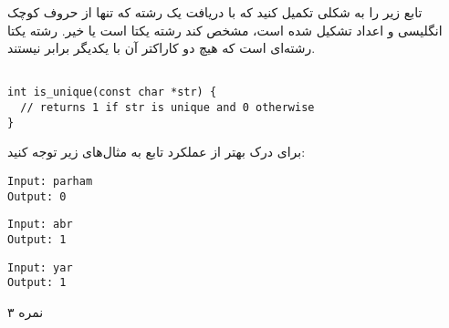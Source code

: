 \documentclass[../main.tex]{subfiles}
\begin{document}
تابع زیر را به شکلی تکمیل کنید که با دریافت یک رشته که تنها از حروف کوچک انگلیسی و اعداد تشکیل شده است، مشخص کند رشته یکتا است یا خیر. رشته یکتا رشته‌ای است که هیچ دو کاراکتر آن با یکدیگر برابر نیستند.

\begin{latin}
\begin{verbatim}

int is_unique(const char *str) {
  // returns 1 if str is unique and 0 otherwise
}

\end{verbatim}
\end{latin}

برای درک بهتر از عملکرد تابع به مثال‌های زیر توجه کنید:

\begin{latin}

\begin{verbatim}
Input: parham
Output: 0
\end{verbatim}

\begin{verbatim}
Input: abr
Output: 1
\end{verbatim}

\begin{verbatim}
Input: yar
Output: 1
\end{verbatim}

\end{latin}

۳ نمره
\end{document}
